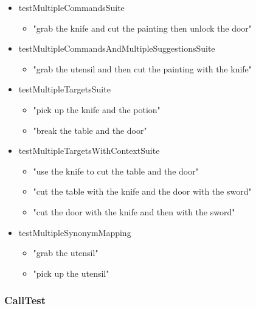 \documentclass[11pt]{article}
\begin{document}
\begin{scriptsize}
\begin{itemize}
\begin{itemize}
	\end{itemize}
\item testMultipleCommandsSuite
	\begin{itemize}
	\item "grab the knife and cut the painting then unlock the door"
	\end{itemize}
\item testMultipleCommandsAndMultipleSuggestionsSuite
	\begin{itemize}
	\item "grab the utensil and then cut the painting with the knife"
	\end{itemize}
\item testMultipleTargetsSuite
	\begin{itemize}
	\item "pick up the knife and the potion"
	\item "break the table and the door"
	\end{itemize}
\item testMultipleTargetsWithContextSuite
	\begin{itemize}
	\item "use the knife to cut the table and the door"
	\item "cut the table with the knife and the door with the sword"
	\item "cut the door with the knife and then with the sword"
	\end{itemize}
\item testMultipleSynonymMapping
	\begin{itemize}
	\item "grab the utensil"
	\item "pick up the utensil"
	\end{itemize}
\end{itemize}
\end{scriptsize}

\subsubsection{CallTest}
\end{document}

